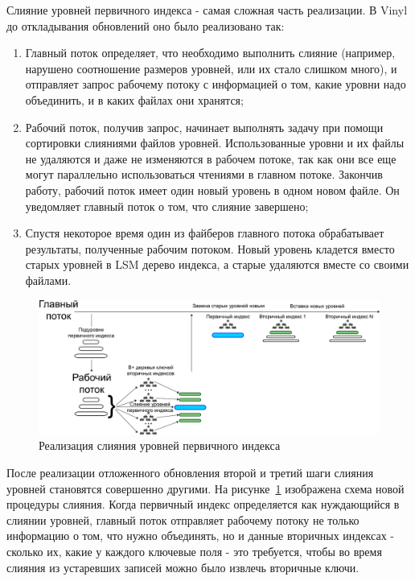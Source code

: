 \documentclass[a4paper,hidelinks,12pt]{article}
\begin{document}
Слияние уровней первичного индекса - самая сложная часть реализации. В Vinyl
до откладывания обновлений оно было реализовано так:
\begin{enumerate}
\item Главный поток определяет, что необходимо выполнить слияние (например,
нарушено соотношение размеров уровней, или их стало слишком много), и отправляет
запрос рабочему потоку с информацией о том, какие уровни надо объединить, и в
каких файлах они хранятся;
\item Рабочий поток, получив запрос, начинает выполнять задачу при помощи
сортировки слияниями файлов уровней. Использованные уровни и их файлы не
удаляются и даже не изменяются в рабочем потоке, так как они все еще могут
параллельно использоваться чтениями в главном потоке. Закончив работу, рабочий
поток имеет один новый уровень в одном новом файле. Он уведомляет главный поток
о том, что слияние завершено;
\item Спустя некоторое время один из файберов главного потока обрабатывает
результаты, полученные рабочим потоком. Новый уровень кладется вместо старых
уровней в LSM дерево индекса, а старые удаляются вместе со своими файлами.
\end{enumerate}

\begin{figure}[h]
\centering
\includegraphics[width=1\textwidth]{compaction_implementation}
\caption{Реализация слияния уровней первичного индекса}
\label{fig:compaction_implementation}
\end{figure}

После реализации отложенного обновления второй и третий шаги слияния уровней
становятся совершенно другими. На рисунке~\ref{fig:compaction_implementation}
изображена схема новой процедуры слияния. Когда первичный индекс определяется
как нуждающийся в слиянии уровней, главный поток отправляет рабочему потоку не
только информацию о том, что нужно объединять, но и данные вторичных индексах -
сколько их, какие у каждого ключевые поля - это требуется, чтобы во время
слияния из устаревших записей можно было извлечь вторичные ключи.
\end{document}
